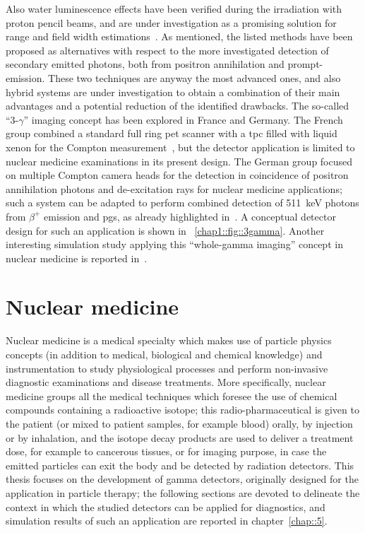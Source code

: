 Also water luminescence effects have been verified during the irradiation  with proton pencil beams, and are under investigation as a promising solution for range and field width estimations~\parencite{Komori2018}.   
As mentioned, the listed methods have been proposed as alternatives with respect to the more investigated detection of secondary emitted photons, both from positron annihilation and prompt-emission. These two techniques are anyway the most advanced ones, and also hybrid systems are under investigation to obtain a combination of their main advantages and a potential reduction of the identified drawbacks.  
The so-called \enquote{3-$\gamma$} imaging concept has been explored in France and Germany. The French group combined a standard full ring \gls{pet} scanner with a \gls{tpc} filled with liquid xenon for the Compton measurement~\parencite{Oger2012}, but the detector application is limited to nuclear medicine examinations in its present design. The German group focused on multiple Compton camera heads for the detection in coincidence of positron annihilation photons and de-excitation rays for nuclear medicine applications; such a system can be adapted to perform combined detection of 511~keV photons from $\beta^+$ emission and \glspl{pg}, as already highlighted in~\parencite{Lang2014}. A conceptual detector design for such an application is shown in \figurename~\ref{chap1::fig::3gamma}. Another interesting simulation study applying this \enquote{whole-gamma imaging} concept in nuclear medicine is reported in~\parencite{Yamaya2017b}. 

\newpage

\section{Nuclear medicine}\label{chap1::sec::NuclearMed}

Nuclear medicine is a medical specialty which makes use of particle physics concepts (in addition to medical, biological and chemical knowledge) and instrumentation to study physiological processes and perform non-invasive diagnostic examinations and disease treatments. More specifically, nuclear medicine groups all the medical techniques which foresee the use of chemical compounds containing a radioactive isotope; this radio-pharmaceutical is given to the patient (or mixed to patient samples, for example blood) orally, by injection or by inhalation, and the isotope decay products are used to deliver a treatment dose, for example to cancerous tissues, or for imaging purpose, in case the emitted particles can exit the body and be detected by radiation detectors. 
This thesis focuses on the development of gamma detectors, originally designed for the application in particle therapy; the following sections are devoted to delineate the context in which the studied detectors can be applied for diagnostics, and simulation results of such an application are reported in chapter~\ref{chap::5}.

